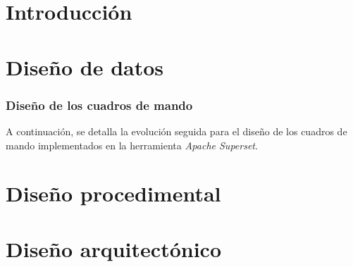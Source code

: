 
\section{Introducción}

\section{Diseño de datos}

\subsubsection{Diseño de los cuadros de mando}

A continuación, se detalla la evolución seguida para el diseño de los cuadros de mando implementados en la herramienta \textit{Apache Superset}.




\section{Diseño procedimental}

\section{Diseño arquitectónico}


